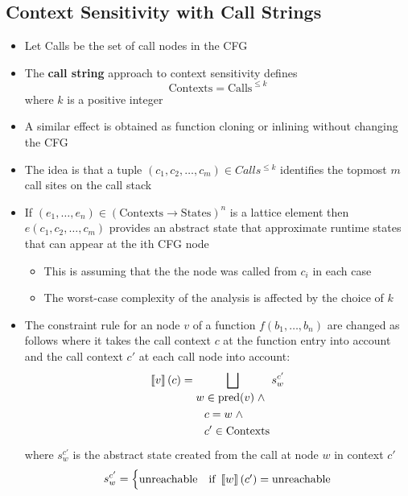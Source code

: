 \subsection{Context Sensitivity with Call Strings}
\begin{itemize}
  \item Let Calls be the set of call nodes in the CFG
  \item The \textbf{call string} approach to context sensitivity defines
  \begin{equation*}
    \text{Contexts} = \text{Calls}^{\leq k}
  \end{equation*}
  where $k$ is a positive integer
	\item A similar effect is obtained as function cloning or inlining without changing the CFG
  \item The idea is that a tuple $(c_1, c_2, \dots, c_m) \in Calls ^{\leq k}$ identifies the topmost $m$ call sites on the call stack
	\item If $(e_1, \dots, e_n) \in (\text{Contexts} \rightarrow \text{States})^n$ is a lattice element then $e(c_1, c_2, \dots, c_m)$ provides an abstract state that approximate runtime states that can appear at the ith CFG node
  \begin{itemize}
  	\item This is assuming that the the node was called from $c_i$ in each case
    \item The worst-case complexity of the analysis is affected by the choice of $k$
  \end{itemize}
  \item The constraint rule for an node $v$ of a function $f(b_1, \dots, b_n)$ are changed as follows where it takes the call context $c$ at the function entry into account and the call context $c'$ at each call node into account:
  \begin{equation*}
    \left\llbracket v\right\rrbracket(c) = \bigsqcup_{\begin{aligned} w & \in \text{pred}(v) \; \land \\ & c = w \; \land \\  & c' \in \text{Contexts} \end{aligned}} s_w^{c'}
  \end{equation*}
  where $s_w^{c'}$ is the abstract state created from the call at node $w$ in context $c'$ 
  \begin{equation*}
    s_w^{c'} =
  \begin{cases} 
    \text{unreachable} & \text{if } \left\llbracket w\right\rrbracket(c') = \text{unreachable}\\

\end{cases}
\end{equation*}
\end{itemize}
